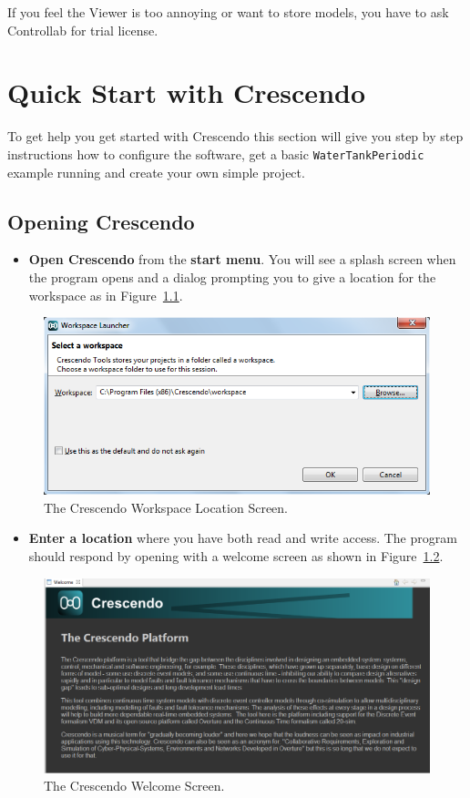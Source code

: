 \documentclass{crescendorepchap}
\begin{document}
If you feel the Viewer is too annoying or want to store models, you have
to ask Controllab for trial license.

\chapter{Quick Start with Crescendo} \label{chap:gettingstarted}

To get help you get started with Crescendo this section will give you step
by step instructions how to configure the software, get a basic
\texttt{WaterTankPeriodic} example running and create your own simple project.


\section{Opening Crescendo}

\begin{itemize}
\item
  \textbf{Open Crescendo} from the \textbf{start menu}.
You will see a splash screen when the program opens and a dialog
prompting you to give a location for the workspace as in Figure~\ref{fig:wsloc}.
\end{itemize}

\begin{figure}[htbp]
\centering
\includegraphics[width=.8\textwidth]{images/DestecsWorkspaceLocation.png}
\caption{The Crescendo Workspace Location Screen.\label{fig:wsloc}}
\end{figure}

\begin{itemize}
\item
  \textbf{Enter a location} where you have both read and write access.
The program should respond by opening with a welcome screen as shown in Figure~\ref{fig:welcome}.
\end{itemize}

\begin{figure}[htbp]
\centering
\includegraphics[width=.8\textwidth]{images/DestecsSplash.png}
\caption{The Crescendo Welcome Screen.\label{fig:welcome}}
\end{figure}
\end{document}
